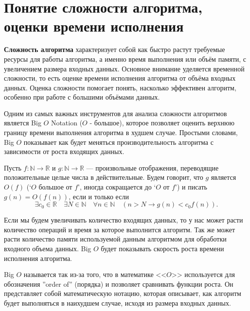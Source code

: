 \section{Понятие сложности алгоритма, оценки времени исполнения}
\textbf{Сложность алгоритма} характеризует собой как быстро растут требуемые ресурсы
для работы алгоритма, а именно время выполнения или объём памяти, с
увеличением размера входных данных. Основное внимание уделяется временной сложности,
то есть оценке времени исполнения алгоритма от объёма входных данных.
Оценка сложности помогает понять, насколько эффективен алгоритм, особенно при работе
с большими объёмами данных.

Одним из самых важных инструментов для анализа сложности алгоритмов является Big $O$ Notation ($O$ - большое),
которое позволяет оценить верхнюю границу времени выполнения алгоритма в худшем случае.
Простыми словами, Big $O$ показывает как будет меняться производительность алгоритма с зависимости
от роста входящих данных.

Пусть $f: \mathbb{N} \rightarrow \mathbb{R}$ и $g: \mathbb{N} \rightarrow \mathbb{R}$ --- произвольные отображения, переводящие
положительные целые числа в действительные. Будем говорит, что $g$ является $O(f)$ (`$O$ большое от $f$', иногда сокращается
до `$O$ от $f$') и писать $g(n) = O(f(n))$, если и только если
$$\exists c_0 \in \mathbb{R}\quad \exists N \in \mathbb{N}\quad \forall n \in \mathbb{N}\quad \left(n > N \rightarrow g(n) < c_0 f(n)\right).$$

Если мы будем увеличивать количество входящих данных, то у нас может расти количество операций и время за
которое выполнится алгоритм. Так же может расти количество памяти используемой данным алгоритмом для обработки
входного объема данных. Big $O$ будет показывать скорость роста времени
исполнения алгоритма.

Big $O$ называется так из-за того, что в математике <<$O$>> используется для обозначения ''order of'' (порядка) и позволяет сравнивать функции роста.
Он представляет собой математическую нотацию, которая описывает, как алгоритм будет выполняться в наихудшем случае, исходя из размера входных данных.


